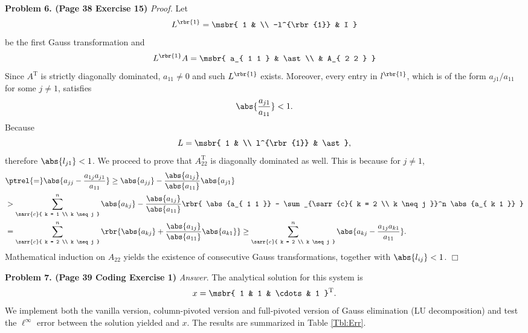 \documentclass[english, nochinese]{pnote}
\begin{document}
\textbf{Problem 6. (Page 38 Exercise 15)} \textit{Proof.} Let
\begin{equation}
L^{\rbr{1}} = \msbr{ 1 & \\ -l^{\rbr{1}} & I }
\end{equation}
be the first Gauss transformation and
\begin{equation}
L^{\rbr{1}} A = \msbr{ a_{ 1 1 } & \ast \\ & A_{ 2 2 } }
\end{equation}
Since $A^{\text{T}}$ is strictly diagonally dominated, $ a_{ 1 1 } \neq 0 $ and such $L^{\rbr{1}}$ exists.
Moreover, every entry in $l^{\rbr{1}}$, which is of the form $ a_{ j 1 } / a_{ 1 1 } $ for some $ j \neq 1 $, satisfies
\begin{equation}
\abs{\frac{a_{ j 1 }}{a_{ 1 1 }}} < 1.
\end{equation}
Because
\begin{equation}
L = \msbr{ 1 & \\ l^{\rbr{1}} & \ast },
\end{equation}
therefore $ \abs{l_{ j 1 }} < 1 $. We proceed to prove that $ A_{ 2 2 }^{\text{T}} $ is diagonally dominated as well. This is because for $ j \neq 1 $,
\begin{equation}
\begin{split}
&\ptrel{=} \abs{ a_{ j j } - \frac{ a_{ 1 j } a_{ j 1 } }{ a_{ 1 1 } }} \ge \abs{a_{ j j }} - \frac{\abs{a_{ 1 j }}}{\abs{a_{ 1 1 }}} \abs{a_{ j 1 }} \\
&> \sum_{\sarr{c}{ k = 1 \\ k \neq j }}^n \abs{a_{ k j }} - \frac{\abs{a_{ 1 j }}}{\abs{a_{ 1 1 }}} \rbr{ \abs{a_{ 1 1 }} - \sum_{\sarr{c}{ k = 2 \\ k \neq j }}^n \abs{a_{ k 1 }} } \\
&= \sum_{\sarr{c}{ k = 2 \\ k \neq j }}^n \rbr{ \abs{a_{ k j }} + \frac{\abs{a_{ 1 j }}}{\abs{a_{ 1 1 }}} \abs{a_{ k 1 }} } \ge \sum_{\sarr{c}{ k = 2 \\ k \neq j }}^n \abs{ a_{ k j } - \frac{ a_{ 1 j } a_{ k 1 } }{a_{ 1 1 }}}.
\end{split}
\end{equation}
Mathematical induction on $ A_{ 2 2 } $ yields the existence of consecutive Gauss transformations, together with $ \abs{l_{ i j }} < 1 $.
\hfill$\Box$

\textbf{Problem 7. (Page 39 Coding Exercise 1)} \textit{Answer}. The analytical solution for this system is
\begin{equation}
x = \msbr{ 1 & 1 & \cdots & 1 }^{\text{T}}.
\end{equation}
We implement both the vanilla version, column-pivoted version and full-pivoted version of Gauss elimination (LU decomposition) and test the $\ell^{\infty}$ error between the solution yielded and $x$. The results are summarized in Table \ref{Tbl:Err}.
\end{document}

